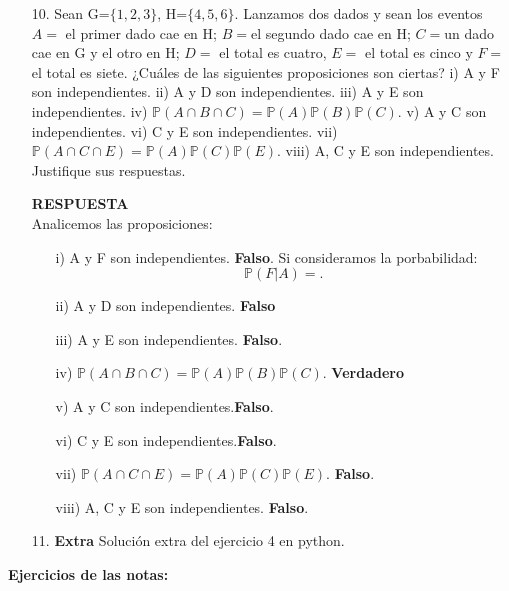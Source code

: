 \documentclass[11pt,letterpaper]{article}
\newcommand{\mP}{\mathbb{P}}
\newcommand{\res}{\textbf{RESPUESTA}\\}
\begin{document}
\begin{itemize}
\item[10.] Sean G=$\{1, 2, 3\}$, H=$\{4, 5, 6\}$. Lanzamos dos dados y sean los eventos $A=$ el primer dado cae en H; $B=$el segundo dado cae en H; $C=$un dado cae en G y el otro en H; $D=$ el total es cuatro, $E=$ el total es cinco y $F=$ el total es siete. ¿Cuáles de las siguientes proposiciones son ciertas? i) A y F son independientes. ii) A y D son independientes. iii) A
y E son independientes. iv) $\mP(A \cap B \cap C) = \mP (A)\mP (B)\mP (C)$. v) A y C son independientes.
vi) C y E son independientes. vii) $\mP (A \cap C \cap E) = \mP (A)\mP (C)\mP (E)$. viii) A, C y E son
independientes. Justifique sus respuestas.

\res

Analicemos las proposiciones:
\begin{itemize}
\item[i)] A y F son independientes. \textbf{Falso}. Si consideramos la porbabilidad: 
$$\mP(F|A)=.$$
\item[ii)] A y D son independientes. \textbf{Falso}
\item[iii)] A y E son independientes. \textbf{Falso}.
\item[iv)] $\mP(A \cap B \cap C) = \mP (A)\mP (B)\mP (C)$. \textbf{Verdadero}
\item[v)] A y C son independientes.\textbf{Falso}.
\item[vi)] C y E son independientes.\textbf{Falso}.
\item[vii)] $\mP (A \cap C \cap E) = \mP (A)\mP (C)\mP (E)$. \textbf{Falso}.
\item[viii)] A, C y E son
independientes. \textbf{Falso}.
\end{itemize}
\item[11.] \textbf{Extra} 
Solución extra del ejercicio 4 en python. 
\end{itemize}

\textbf{Ejercicios de las notas: }
\end{document}
